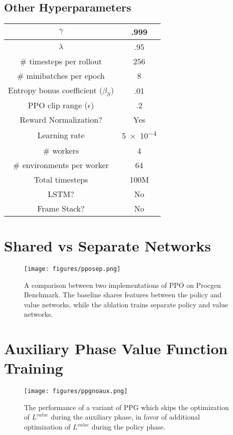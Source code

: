 \documentclass{article}
\begin{document}
\subsection{Other Hyperparameters}

\begin{center}
 \begin{tabular}{||c c||} 
 \hline
 $\gamma$ & .999 \\ 
 \hline
 $\lambda$ & .95 \\
 \hline
 \# timesteps per rollout & 256 \\
 \hline
 \# minibatches per epoch & 8 \\ 
 \hline
 Entropy bonus coefficient ($\beta_S$) & .01 \\
 \hline
 PPO clip range ($\epsilon$) & .2 \\
 \hline
 Reward Normalization? & Yes \\
 \hline
 Learning rate & \num{5e-4} \\
 \hline
 \# workers & 4 \\
 \hline
 \# environments per worker & 64 \\ 
 \hline
 Total timesteps & 100M \\
 \hline
 LSTM? & No \\
 \hline
 Frame Stack? & No \\
 \hline
\end{tabular}
\end{center}

\newpage
\section{Shared vs Separate Networks} \label{appendix:separate_networks}

\begin{figure*}[h]
\centering
\texttt{[image: figures/pposep.png]}
\caption{A comparison between two implementations of PPO on Procgen Benchmark. The baseline shares features between the policy and value networks, while the ablation trains separate policy and value networks.}
\label{fig:pposep}
\end{figure*}

\newpage
\section{Auxiliary Phase Value Function Training} \label{appendix:vf_aux_true}

\begin{figure*}[h]
\centering
\texttt{[image: figures/ppgnoaux.png]}
\caption{The performance of a variant of PPG which skips the optimization of $L^{value}$ during the auxiliary phase, in favor of additional optimization of $L^{value}$ during the policy phase.}
\label{fig:ppgnoaux}
\end{figure*}
\end{document}
